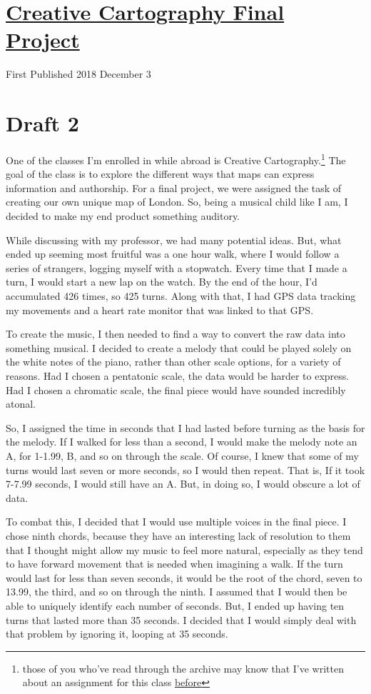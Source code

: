 \documentclass[12pt]{article}[titlepage]
\newcommand{\1}{\={a}}
\newcommand{\2}{\={e}}
\newcommand{\3}{\={\i}}
\newcommand{\4}{\=o}
\newcommand{\5}{\=u}
\newcommand{\6}{\={A}}
\renewcommand{\,}{\textsuperscript{,}}
\begin{document}
\doublespacing
\section{\href{cartography-final.html}{Creative Cartography Final Project}}
First Published 2018 December 3
\section{Draft 2}
One of the classes I'm enrolled in while abroad is Creative Cartography.\footnote{those of you who've read through the archive may know that I've written about an assignment for this class \href{riverwalk.html}{before}}
The goal of the class is to explore the different ways that maps can express information and authorship.
For a final project, we were assigned the task of creating our own unique map of London.
So, being a musical child like I am, I decided to make my end product something auditory.

While discussing with my professor, we had many potential ideas.
But, what ended up seeming most fruitful was a one hour walk, where I would follow a series of strangers, logging myself with a stopwatch.
Every time that I made a turn, I would start a new lap on the watch.
By the end of the hour, I'd accumulated 426 times, so 425 turns.
Along with that, I had GPS data tracking my movements and a heart rate monitor that was linked to that GPS.

To create the music, I then needed to find a way to convert the raw data into something musical.
I decided to create a melody that could be played solely on the white notes of the piano, rather than other scale options, for a variety of reasons.
Had I chosen a pentatonic scale, the data would be harder to express.
Had I chosen a chromatic scale, the final piece would have sounded incredibly atonal.

So, I assigned the time in seconds that I had lasted before turning as the basis for the melody.
If I walked for less than a second, I would make the melody note an A, for 1-1.99, B, and so on through the scale.
Of course, I knew that some of my turns would last seven or more seconds, so I would then repeat.
That is, If it took 7-7.99 seconds, I would still have an A.
But, in doing so, I would obscure a lot of data.

To combat this, I decided that I would use multiple voices in the final piece. 
I chose ninth chords, because they have an interesting lack of resolution to them that I thought might allow my music to feel more natural, especially as they tend to have forward movement that is needed when imagining a walk.
If the turn would last for less than seven seconds, it would be the root of the chord, seven to 13.99, the third, and so on through the ninth.
I assumed that I would then be able to uniquely identify each number of seconds.
But, I ended up having ten turns that lasted more than 35 seconds.
I decided that I would simply deal with that problem by ignoring it, looping at 35 seconds.
\end{document}
